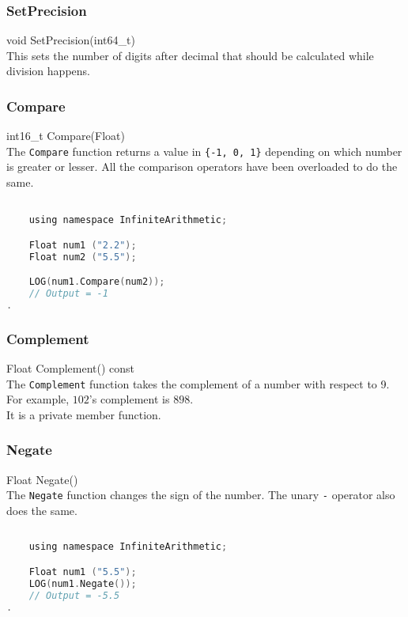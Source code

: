 \subsubsection{SetPrecision}
{\ttfamily \large void SetPrecision(int64\_t)} \\[2mm]
This sets the number of digits after decimal that should be calculated while division happens.



\subsubsection{Compare}
{\ttfamily \large int16\_t Compare(Float)} \\[2mm]
The \verb|Compare| function returns a value in \verb|{-1, 0, 1}| depending on which number is greater or lesser. All the comparison operators have been overloaded to do the same.
\vspace*{1em}
\begin{lstlisting}[language = C]

	using namespace InfiniteArithmetic;

	Float num1 ("2.2");
	Float num2 ("5.5");

	LOG(num1.Compare(num2));
	// Output = -1
.
\end{lstlisting}
\vspace*{1em}


\subsubsection{Complement}
{\ttfamily \large Float Complement() const} \\[2mm]
The \verb|Complement| function takes the complement of a number with respect to 9. For example, $102$'s complement is $898$. \\
It is a private member function.


\subsubsection{Negate}
{\ttfamily \large Float Negate()} \\[2mm]
The \verb|Negate| function changes the sign of the number. The unary \verb|-| operator also does the same.
\vspace*{1em}
\begin{lstlisting}[language = C]
	
	using namespace InfiniteArithmetic;

	Float num1 ("5.5");
	LOG(num1.Negate());
	// Output = -5.5
.
\end{lstlisting}
\vspace*{1em}


